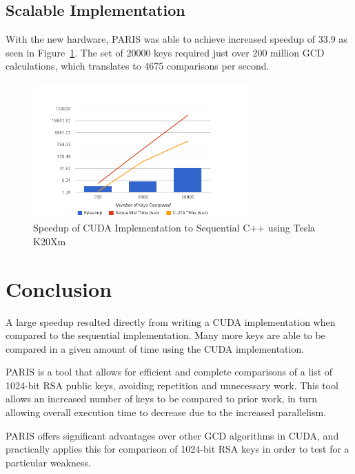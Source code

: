 \documentclass[smallextended]{svjour3}       %
\begin{document}
\subsection{Scalable Implementation}
\label{subsec:scaleimpl}
With the new hardware, PARIS was able to achieve increased speedup of 33.9 as
seen in Figure~\ref{fig:newspeedup}. The set of 20000 keys required just over
200 million GCD calculations, which translates to 4675 comparisons per second.

\begin{figure}
   \centering
   \includegraphics[width=0.75\textwidth]{chart_8}
   \caption{Speedup of CUDA Implementation to Sequential C++ using Tesla K20Xm}
   \label{fig:newspeedup}
\end{figure}


\section{Conclusion}
\label{sec:concl}
A large speedup resulted directly from writing a CUDA 
implementation when compared to the sequential implementation. Many 
more keys are able to be compared in a given amount of time using the CUDA
implementation. 

PARIS is a tool that allows for efficient and complete comparisons of a list of
1024-bit RSA public keys, avoiding repetition and unnecessary work. This tool
allows an increased number of keys to be compared to prior work, in turn
allowing overall execution time to decrease due to the increased parallelism.

PARIS offers significant advantages over other GCD algorithms in CUDA, and
practically applies this for comparison of 1024-bit RSA keys in order to test
for a particular weakness.

\end{document}
